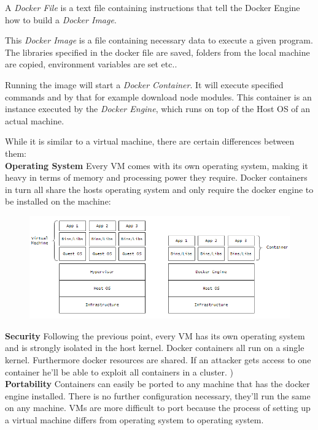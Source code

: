 A \emph{Docker File} is a text file containing instructions that tell the Docker Engine how to build a \emph{Docker Image}. \cite{NickDocker}

This \emph{Docker Image} is a file containing necessary data to execute a given program. The libraries specified in the docker file are saved, folders from the local machine are copied, environment variables are set etc.. 

Running the image will start a \emph{Docker Container}. It will execute specified commands and by that for example download node modules. This container is an instance executed by the \emph{Docker Engine}, which runs on top of the Host OS of an actual machine.

While it is similar to a virtual machine, there are certain differences between them: \\
\textbf{Operating System} Every VM comes with its own operating system, making it heavy in terms of memory and processing power they require. Docker containers in turn all share the hosts operating system and only require the docker engine to be installed on the machine: 
\begin{figure}[H]
\centering
\includegraphics[scale=.8]{Bilder/DockerVsVM.png}
\label{ex312}
\end{figure}
\noindent
\textbf{Security} Following the previous point, every VM has its own operating system and is strongly isolated in the host kernel. Docker containers all run on a single kernel. Furthermore docker resources are shared. If an attacker gets access to one container he'll be able to exploit  all containers in a cluster. \cite{GeekDocker}) \\
\textbf{Portability} Containers can easily be ported to any machine that has the docker engine installed. There is no further configuration necessary, they'll run the same on any machine. VMs are more difficult to port because the process of setting up a virtual machine differs from operating system to operating system. 

